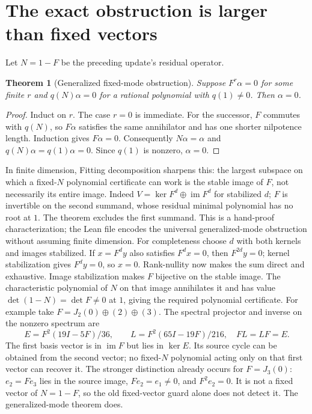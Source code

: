 \documentclass[11pt]{article}
\newtheorem{theorem}{Theorem}
\begin{document}
\section{The exact obstruction is larger than fixed vectors}
Let $N=1-F$ be the preceding update's residual operator.
\begin{theorem}[Generalized fixed-mode obstruction]
Suppose $F^r\alpha=0$ for some finite $r$ and
$q(N)\alpha=0$ for a rational polynomial with $q(1)\ne0$.
Then $\alpha=0$.
\end{theorem}
\begin{proof}
Induct on $r$. The case $r=0$ is immediate. For the successor, $F$ commutes
with $q(N)$, so $F\alpha$ satisfies the same annihilator and has one shorter
nilpotence length. Induction gives $F\alpha=0$. Consequently $N\alpha=\alpha$
and $q(N)\alpha=q(1)\alpha=0$. Since $q(1)$ is nonzero, $\alpha=0$.
\end{proof}
In finite dimension, Fitting decomposition sharpens this: the largest
subspace on which a fixed-$N$ polynomial certificate can work is the stable
image of $F$, not necessarily its entire image. Indeed $V=\ker F^d\oplus
\operatorname{im}F^d$ for stabilized $d$; $F$ is invertible on the second
summand, whose residual minimal polynomial has no root at $1$. The theorem
excludes the first summand. This is a hand-proof characterization; the Lean
file encodes the universal generalized-mode obstruction without assuming
finite dimension.
For completeness choose $d$ with both kernels and images stabilized.
If $x=F^dy$ also satisfies $F^dx=0$, then $F^{2d}y=0$; kernel stabilization
gives $F^dy=0$, so $x=0$. Rank-nullity now makes the sum direct and exhaustive.
Image stabilization makes $F$ bijective on the stable image. The characteristic
polynomial of $N$ on that image annihilates it and has value
$\det(1-N)=\det F\ne0$ at $1$, giving the required polynomial certificate.
For example take $F=J_2(0)\oplus(2)\oplus(3)$.
The spectral projector and inverse on the nonzero spectrum are
\[
 E=F^2(19I-5F)/36,\qquad L=F^2(65I-19F)/216,
 \quad FL=LF=E.
\]
The first basis vector is in $\operatorname{im}F$ but lies in $\ker E$.
Its source cycle can be obtained from the second vector; no fixed-$N$
polynomial acting only on that first vector can recover it.
The stronger distinction already occurs for $F=J_3(0)$:
$e_2=Fe_3$ lies in the source image, $Fe_2=e_1\ne0$, and $F^2e_2=0$.
It is not a fixed vector of $N=1-F$, so the old fixed-vector guard alone
does not detect it. The generalized-mode theorem does.
\end{document}
